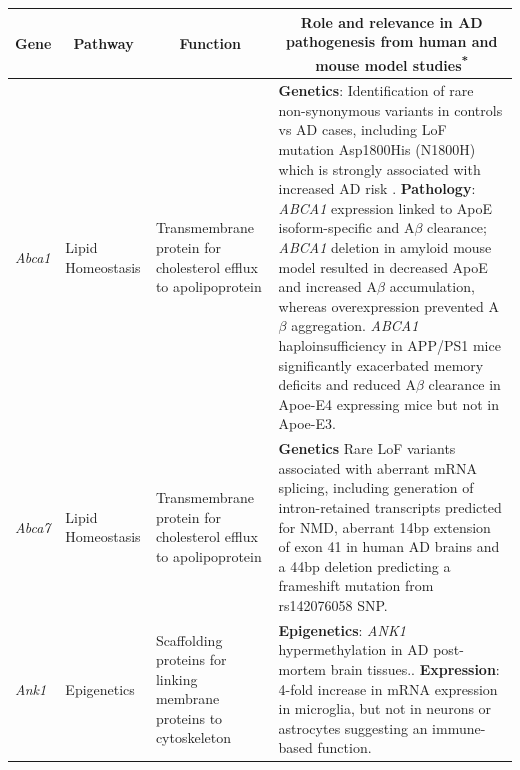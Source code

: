 \begin{landscape}
\begin{longtable}[c]{p{1cm}p{2cm}p{4cm}p{19cm}}
			\toprule
			\multicolumn{1}{c}{Gene} &
			\multicolumn{1}{c}{Pathway} &
			\multicolumn{1}{c}{Function} &
			\multicolumn{1}{c}{Role and relevance in AD pathogenesis from human and mouse model studies\textsuperscript{*}} \\* \midrule
			\endfirsthead	%
			\endhead%
			\bottomrule
			\endfoot%
			\endlastfoot%
			\centering \textit{Abca1} &
			\centering Lipid Homeostasis  &
			\centering Transmembrane protein for cholesterol efflux to apolipoprotein \newline &
			\tabitem\textbf{Genetics}: Identification of rare non-synonymous variants in controls vs AD cases, including LoF mutation Asp1800His (N1800H) which is strongly associated with increased AD risk \cite{Nordestgaard2015}. \newline
			\tabitem \textbf{Pathology}: \textit{ABCA1} expression linked to ApoE isoform-specific and A$\beta$ clearance; \textit{ABCA1} deletion in amyloid mouse model resulted in decreased ApoE and increased A$\beta$ accumulation, whereas overexpression prevented A$\beta$ aggregation\cite{Koldamova2014}. \textit{ABCA1} haploinsufficiency in APP/PS1 mice significantly exacerbated memory deficits and reduced A$\beta$ clearance in Apoe-E4 expressing mice but not in Apoe-E3\cite{Fitz2012}.\ \\
			\hdashline[0.5pt/5pt]
			
			\centering \textit{Abca7} &
			\centering Lipid Homeostasis  &
			\centering Transmembrane protein for cholesterol efflux to apolipoprotein  &
			\tabitem \textbf{Genetics} Rare LoF variants associated with aberrant mRNA splicing, including generation of intron-retained transcripts predicted for NMD\cite{Steinberg2015,Cuyvers2015,Guennec2016},  aberrant 14bp extension of exon 41 in human AD brains\cite{Steinberg2015,Grear2009} and a 44bp deletion predicting a frameshift mutation from rs142076058 SNP. \cite{Cukier2016} \\
			\hdashline[0.5pt/5pt]
			
			\centering \textit{Ank1} &
			\centering Epigenetics  &
			\centering Scaffolding proteins for linking membrane proteins to cytoskeleton &
			\tabitem \textbf{Epigenetics}: \textit{ANK1} hypermethylation in AD post-mortem brain tissues.\cite{Smith2019, Lunnon2014}. \newline 
			\tabitem \textbf{Expression}: 4-fold increase in mRNA expression in microglia, but not in neurons or astrocytes suggesting an immune-based function. \cite{Mastroeni2017}  \\
			

\end{longtable}
\end{landscape}
